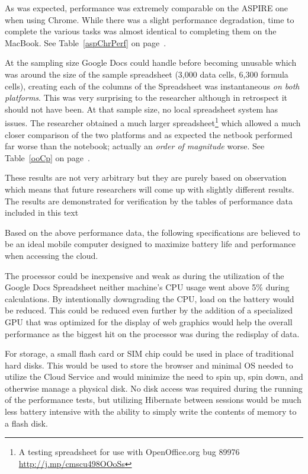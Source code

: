 As was expected, performance was extremely comparable on the ASPIRE one when
using Chrome.  While there was a slight performance degradation, time to
complete the various tasks was almost identical to completing them on the
MacBook.  See Table~\ref{aspChrPerf} on page~\pageref{aspChrPerf}.



At the sampling size Google Docs could handle before becoming unusable which was
around the size of the sample spreadsheet (3,000 data cells, 6,300 formula
cells), creating each of the columns of the Spreadsheet was instantaneous
\emph{on both platforms}.  This was very surprising to the researcher although
in retrospect it should not have been.  At that sample size, no local
spreadsheet system has issues.  The researcher obtained a much larger
spreadsheet\footnote{A testing spreadsheet for use with OpenOffice.org bug 89976
  \url{http://j.mp/cmscu498OOoSs}} which allowed a much closer comparison of the
two platforms and as expected the netbook performed far worse than the notebook;
actually an \emph{order of magnitude} worse.  See Table~\ref{ooCp} on
page~\pageref{ooCp}.



These results are not very arbitrary but they are purely based on observation
which means that future researchers will come up with slightly different
results.  The results are demonstrated for verification by the tables of
performance data included in this text

Based on the above performance data, the following specifications are believed
to be an ideal mobile computer designed to maximize battery life and performance
when accessing the cloud.

The processor could be inexpensive and weak as during the utilization of the
Google Docs Spreadsheet neither machine's CPU usage went above 5\% during
calculations.  By intentionally downgrading the CPU, load on the battery would
be reduced.  This could be reduced even further by the addition of a specialized
GPU that was optimized for the display of web graphics would help the overall
performance as the biggest hit on the processor was during the redisplay of
data.

For storage, a small flash card or SIM chip could be used in place of
traditional hard disks.  This would be used to store the browser and minimal OS
needed to utilize the Cloud Service and would minimize the need to spin up, spin
down, and otherwise manage a physical disk.  No disk access was required during
the running of the performance tests, but utilizing Hibernate between sessions
would be much less battery intensive with the ability to simply write the
contents of memory to a flash disk.

